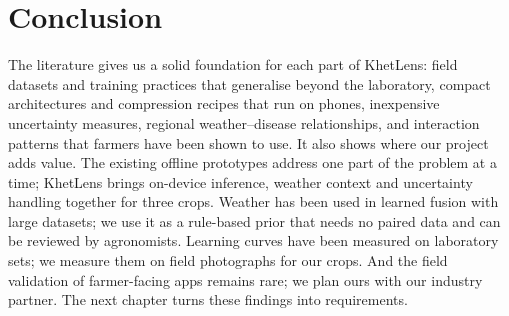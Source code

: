\section{Conclusion}
\label{sec:gaps}
The literature gives us a solid foundation for each part of KhetLens: field datasets and training practices that generalise beyond the laboratory, compact architectures and compression recipes that run on phones, inexpensive uncertainty measures, regional weather--disease relationships, and interaction patterns that farmers have been shown to use. It also shows where our project adds value. The existing offline prototypes address one part of the problem at a time; KhetLens brings on-device inference, weather context and uncertainty handling together for three crops. Weather has been used in learned fusion with large datasets; we use it as a rule-based prior that needs no paired data and can be reviewed by agronomists. Learning curves have been measured on laboratory sets; we measure them on field photographs for our crops. And the field validation of farmer-facing apps remains rare; we plan ours with our industry partner. The next chapter turns these findings into requirements.
